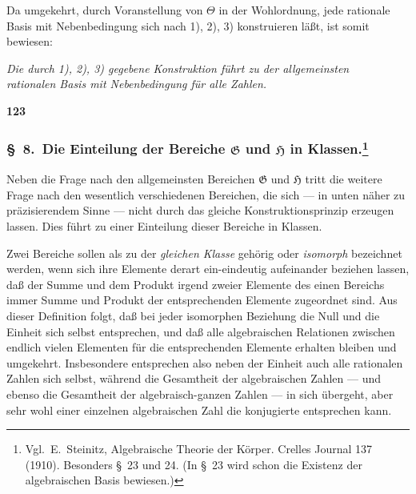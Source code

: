 \documentclass[12pt,a4paper]{article}
\begin{document}
Da umgekehrt, durch Voranstellung von $\Theta$ in der Wohlordnung, jede rationale Basis mit Nebenbedingung sich nach 1), 2), 3) konstruieren l\"a\ss t, ist somit bewiesen:

\begin{center}
\emph{Die durch 1), 2), 3) gegebene Konstruktion f\"uhrt zu der allgemeinsten\\
rationalen Basis mit Nebenbedingung f\"ur alle Zahlen.}
\end{center}

\newpage
\begin{center}
\textbf{123}
\end{center}

\subsubsection*{\S\ 8.\ Die Einteilung der Bereiche $\mathfrak{G}$ und $\mathfrak{H}$ in Klassen.\footnote{Vgl.\ E.\ Steinitz, Algebraische Theorie der K\"orper. Crelles Journal 137 (1910). Besonders \S\ 23 und 24. (In \S\ 23 wird schon die Existenz der algebraischen Basis bewiesen.)}}

Neben die Frage nach den allgemeinsten Bereichen $\mathfrak{G}$ und $\mathfrak{H}$ tritt die weitere Frage nach den wesentlich verschiedenen Bereichen, die sich --- in unten n\"aher zu pr\"azisierendem Sinne --- nicht durch das gleiche Konstruktionsprinzip erzeugen lassen. Dies f\"uhrt zu einer Einteilung dieser Bereiche in Klassen.

Zwei Bereiche sollen als zu der \emph{gleichen Klasse} geh\"orig oder \emph{isomorph} bezeichnet werden, wenn sich ihre Elemente derart ein-eindeutig aufeinander beziehen lassen, da\ss{} der Summe und dem Produkt irgend zweier Elemente des einen Bereichs immer Summe und Produkt der entsprechenden Elemente zugeordnet sind. Aus dieser Definition folgt, da\ss{} bei jeder isomorphen Beziehung die Null und die Einheit sich selbst entsprechen, und da\ss{} alle algebraischen Relationen zwischen endlich vielen Elementen f\"ur die entsprechenden Elemente erhalten bleiben und umgekehrt. Insbesondere entsprechen also neben der Einheit auch alle rationalen Zahlen sich selbst, w\"ahrend die Gesamtheit der algebraischen Zahlen --- und ebenso die Gesamtheit der algebraisch-ganzen Zahlen --- in sich \"ubergeht, aber sehr wohl einer einzelnen algebraischen Zahl die konjugierte entsprechen kann.
\end{document}
